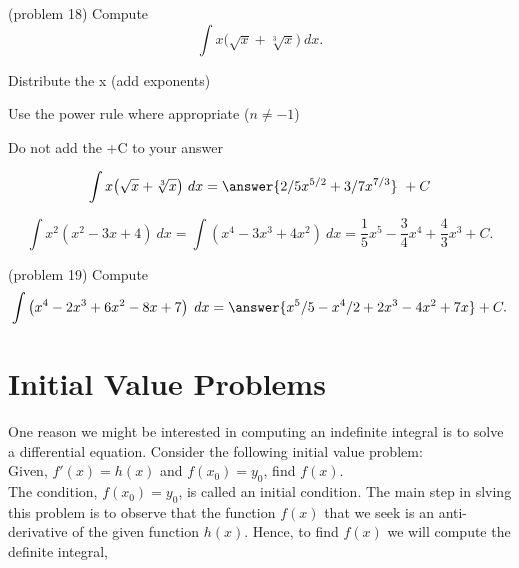 \documentclass[handout]{ximera}
\begin{document}
\begin{problem}(problem 18)
Compute
\[
\int x\big(\sqrt x + \sqrt[3] x \big) \ dx.
\]

\begin{hint}
Distribute the x (add exponents)
\end{hint}
\begin{hint}
Use the power rule where appropriate ($n\neq -1$)
\end{hint}
\begin{hint}
\begin{center}
Do not add the +C to your answer
\end{center}
\end{hint}

\[
\int  x\big(\sqrt x + \sqrt[3] x \big) \ dx =
\answer{2/5 x^{5/2} + 3/7 x^{7/3}} \ +  C
\]
\end{problem}


\begin{example}[example 19]
\[
\int x^2(x^2 - 3x + 4) \ dx = \int (x^4 - 3x^3 + 4x^2) \ dx = \frac15 x^5 - \frac{3}{4}x^4 + \frac43 x^3 + C.
\]

\end{example}

\begin{problem}(problem 19)
Compute
\[
\int \left(x^4 - 2x^3 + 6x^2 - 8x + 7 \right) \; dx = \answer{ x^5/5 - x^4/2 + 2x^3 - 4x^2 + 7x} + C.
\]
\end{problem}





\section{Initial Value Problems}


One reason we might be interested in computing an indefinite integral is to solve a differential equation. Consider the following initial value problem:\\
Given, $f'(x) = h(x)$ and $f(x_0) = y_0$, find $f(x)$.\\
The condition, $f(x_0) = y_0$, is called an initial condition. The main step in slving this problem is to observe that the function $f(x)$ that we seek is an anti-derivative of the given function $h(x)$. Hence, to find $f(x)$ we will compute the definite integral, 
\end{document}
